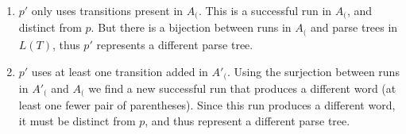 \documentclass[sigplan]{acmart}\settopmatter{printfolios=true,printccs=false,printacmref=false}
\newcommand{\T}{\mathbb{T}} %
\newcommand{\yield}{\mathit{yield}} %
\begin{document}
\begin{enumerate}
  \item $p'$ only uses transitions present in $A_($. This is a successful run in $A_($, and distinct from $p$. But there is a bijection between runs in $A_($ and parse trees in $L(T)$, thus $p'$ represents a different parse tree.
  \item $p'$ uses at least one transition added in $A'_($. Using the surjection between runs in $A'_($ and $A_($ we find a new successful run that produces a different word (at least one fewer pair of parentheses). Since this run produces a different word, it must be distinct from $p$, and thus represent a different parse tree.
\end{enumerate}








\end{document}
